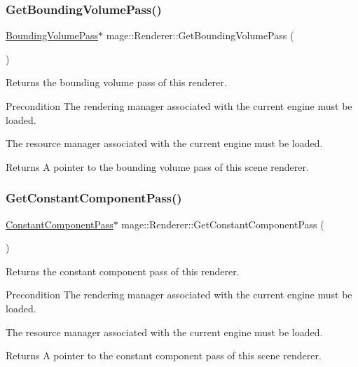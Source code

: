 \subsubsection{\texorpdfstring{Get\+Bounding\+Volume\+Pass()}{GetBoundingVolumePass()}}
{\footnotesize\ttfamily \hyperlink{classmage_1_1_bounding_volume_pass}{Bounding\+Volume\+Pass}$\ast$ mage\+::\+Renderer\+::\+Get\+Bounding\+Volume\+Pass (\begin{DoxyParamCaption}{ }\end{DoxyParamCaption})}

Returns the bounding volume pass of this renderer.

\begin{DoxyPrecond}{Precondition}
The rendering manager associated with the current engine must be loaded. 

The resource manager associated with the current engine must be loaded. 
\end{DoxyPrecond}
\begin{DoxyReturn}{Returns}
A pointer to the bounding volume pass of this scene renderer. 
\end{DoxyReturn}
\hypertarget{classmage_1_1_renderer_ae0299628a5475fb8587186a4cacc6a75}{}\label{classmage_1_1_renderer_ae0299628a5475fb8587186a4cacc6a75} 
\subsubsection{\texorpdfstring{Get\+Constant\+Component\+Pass()}{GetConstantComponentPass()}}
{\footnotesize\ttfamily \hyperlink{classmage_1_1_constant_component_pass}{Constant\+Component\+Pass}$\ast$ mage\+::\+Renderer\+::\+Get\+Constant\+Component\+Pass (\begin{DoxyParamCaption}{ }\end{DoxyParamCaption})}

Returns the constant component pass of this renderer.

\begin{DoxyPrecond}{Precondition}
The rendering manager associated with the current engine must be loaded. 

The resource manager associated with the current engine must be loaded. 
\end{DoxyPrecond}
\begin{DoxyReturn}{Returns}
A pointer to the constant component pass of this scene renderer. 
\end{DoxyReturn}
\hypertarget{classmage_1_1_renderer_a190ca65f3a88e4c4e607e0909674a9d9}{}\label{classmage_1_1_renderer_a190ca65f3a88e4c4e607e0909674a9d9} 
